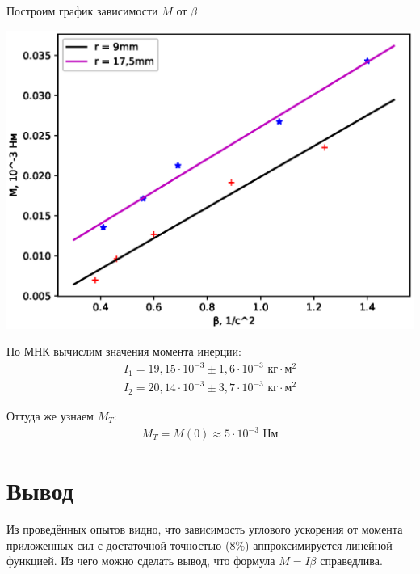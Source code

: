 \documentclass[a4paper, 12pt]{article}
\begin{document}
Построим график зависимости $M$ от $\beta$

\includegraphics[scale = 0.7]{Plot2.eps}

По МНК вычислим значения момента инерции:
\begin{align*}
I_1 = 19,15 \cdot 10^{-3} \pm 1,6 \cdot 10^{-3} \text{ кг$\cdot$м$^2$} \\
I_2 = 20,14 \cdot 10^{-3} \pm 3,7 \cdot 10^{-3} \text{ кг$\cdot$м$^2$}
\end{align*}

Оттуда же узнаем $M_T$:
\begin{align*}
M_T = M(0) \approx 5 \cdot 10^{-3} \text{ Нм}
\end{align*}

\section{Вывод}

Из проведённых опытов видно, что зависимость углового ускорения от момента приложенных сил с достаточной точностью (8\%) аппроксимируется линейной функцией. Из чего можно сделать вывод, что формула $M = I\beta$ справедлива.
\end{document}
